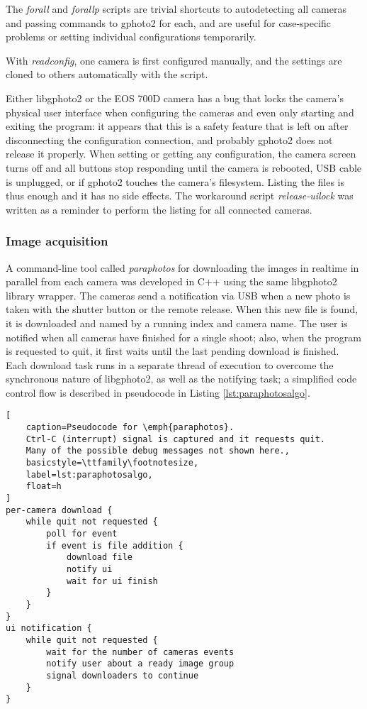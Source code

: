 The \emph{forall} and \emph{forallp} scripts are trivial shortcuts to autodetecting all cameras and passing commands to gphoto2 for each, and are useful for case-specific problems or setting individual configurations temporarily.

With \emph{readconfig}, one camera is first configured manually, and the settings are cloned to others automatically with the script.

Either libgphoto2 or the EOS 700D camera has a bug that locks the camera's physical user interface when configuring the cameras and even only starting and exiting the program:
it appears that this is a safety feature that is left on after disconnecting the configuration connection, and probably gphoto2 does not release it properly.
When setting or getting any configuration, the camera screen turns off and all buttons stop responding until the camera is rebooted, USB cable is unplugged, or if gphoto2 touches the camera's filesystem.
Listing the files is thus enough and it has no side effects.
The workaround script \emph{release-uilock} was written as a reminder to perform the listing for all connected cameras.


\subsubsection{Image acquisition} %


A command-line tool called \emph{paraphotos} for downloading the images in realtime in parallel from each camera was developed in C++ using the same libgphoto2 library wrapper.
The cameras send a notification via USB when a new photo is taken with the shutter button or the remote release.
When this new file is found, it is downloaded and named by a running index and camera name.
The user is notified when all cameras have finished for a single shoot;
also, when the program is requested to quit, it first waits until the last pending download is finished.
Each download task runs in a separate thread of execution to overcome the synchronous nature of libgphoto2, as well as the notifying task; a simplified code control flow is described in pseudocode in Listing \ref{lst:paraphotosalgo}.

\begin{lstlisting}[
	caption=Pseudocode for \emph{paraphotos}.
	Ctrl-C (interrupt) signal is captured and it requests quit.
	Many of the possible debug messages not shown here.,
	basicstyle=\ttfamily\footnotesize,
	label=lst:paraphotosalgo,
	float=h
]
per-camera download {
	while quit not requested {
		poll for event
		if event is file addition {
			download file
			notify ui
			wait for ui finish
		}
	}
}
ui notification {
	while quit not requested {
		wait for the number of cameras events
		notify user about a ready image group
		signal downloaders to continue
	}
}
\end{lstlisting}

